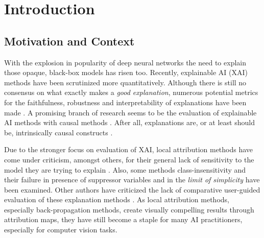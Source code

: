 \chapter{Introduction}\label{chapter:introduction}

\section{Motivation and Context}
With the explosion in popularity of deep neural networks the need to explain those opaque, black-box models has risen too. Recently, explainable AI (XAI) methods have been scrutinized more quantitatively. Although there is still no consensus on what exactly makes a \textit{good explanation}, numerous potential metrics for the faithfulness, robustness and interpretability of explanations have been made \cite{Nauta2023}. A promising branch of research seems to be the evaluation of explainable AI methods with causal methods \cite{Moraffah2020a}. After all, explanations are, or at least should be, intrinsically causal constructs \cite{Woodward2004, Halpern2005, Schoelkopf2019}.

Due to the stronger focus on evaluation of XAI, local attribution methods have come under criticism, amongst others, for their general lack of sensitivity to the model they are trying to explain \cite{Adebayo2018, Karimi2023}. Also, some methods class-insensitivity \cite{Sixt2020} and their failure in presence of suppressor variables \cite{Wilming2023} and in the \textit{limit of simplicity} \cite{Kindermans2017} have been examined. Other authors have criticized the lack of comparative user-guided evaluation of these explanation methods \cite{Rong2023}. 
As local attribution methods, especially back-propagation methods, create visually compelling results through attribution maps, they have still become a staple for many AI practitioners, especially for computer vision tasks.  

